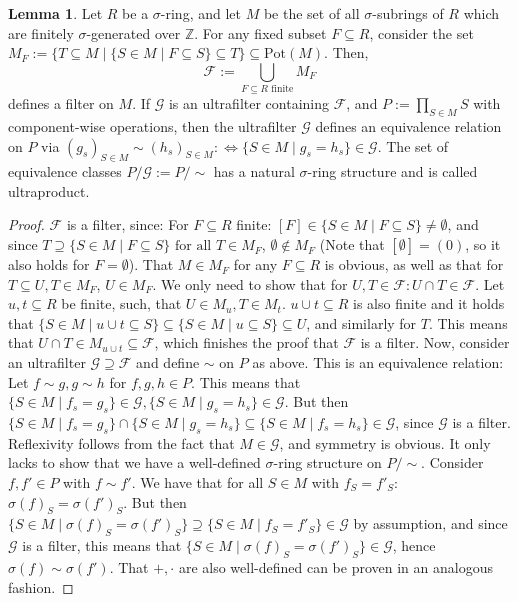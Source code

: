 \documentclass{article}
\def\Z{\mathbb{Z}}
\def\s{\sigma}
\def\fa{\text{ for all }}
\theoremstyle{definition}
\newtheorem{lem}[Satz]{Lemma}
\begin{document}
\begin{lem}\label{lemmafilters}
Let $R$ be a $\s$-ring, and let $M$ be the set of all $\s$-subrings of $R$ which are finitely $\s$-generated over $\Z$. For any fixed subset $F \subseteq R$, consider the set $M_F:= \{ T \subseteq M \mid \{S \in M \mid F \subseteq S \} \subseteq T \} \subseteq \text{Pot}(M)$. 
Then, \[ \mathcal{F}:= \bigcup_{ F \subseteq R \text{ finite} } M_F \]
 defines a filter on $M$. If $\mathcal{G}$ is an ultrafilter containing $\mathcal{F}$, and $P:= \prod_{S \in M} S$ with component-wise operations,
 then the ultrafilter $\mathcal{G}$ defines an equivalence relation on $P$ via $(g_s)_{S \in M} \sim (h_s)_{S \in M} : \Leftrightarrow \{ S \in M \mid g_s = h_s \} \in \mathcal{G}$. 
The set of equivalence classes $P/\mathcal{G}:= P/\sim$ has a natural $\s$-ring structure and is called ultraproduct. %
\begin{proof}
$\mathcal{F}$ is a filter, since: 
  For $F \subseteq R$ finite: $[F] \in \{ S \in M \mid F \subseteq S \} \neq \emptyset$, and since $T \supseteq \{ S \in M \mid F \subseteq S \} \fa T \in M_F$, $\emptyset \notin M_F$ (Note that $[\emptyset] = (0)$, so it also holds for $F = \emptyset$).
  That $M \in M_F$ for any $F \subseteq R$ is obvious, as well as that for $T \subseteq U, T \in M_F$, $U \in M_F$. We only need to show that for $U,T \in \mathcal{F}: U \cap T \in \mathcal{F}$.
  Let $u, t \subseteq R$ be finite, such, that $U \in M_u, T \in M_t$. $u \cup t \subseteq R$ is also finite and it holds that  $\{ S \in M \mid u \cup t \subseteq S \} \subseteq \{ S \in M \mid u \subseteq S \} \subseteq U$,
 and similarly for $T$. This means that $U \cap T \in M_{u \cup t} \subseteq \mathcal{F}$, which finishes the proof that $\mathcal{F}$ is a filter.
 Now, consider an ultrafilter $\mathcal{G} \supseteq \mathcal{F}$ and define $\sim$ on $P$ as above. This is an equivalence relation: Let $f \sim g, g \sim h$ for $f,g,h \in P$. 
 This means that $\{ S \in M \mid f_s = g_s \} \in \mathcal{G}, \{ S \in M \mid g_s = h_s \} \in \mathcal{G}$. But then $\{ S \in M \mid f_s = g_s \} \cap \{ S \in M \mid g_s = h_s \} \subseteq \{ S \in M \mid f_s = h_s \} \in \mathcal{G}$, since $\mathcal{G}$ is a filter.
 Reflexivity follows from the fact that $M \in \mathcal{G}$, and symmetry is obvious. It only lacks to show that we have a well-defined $\s$-ring structure on $P/\sim$.
 Consider $f,f' \in P$ with $f \sim f'$. We have that for all $S \in M$ with $f_S = f'_S$:  $\sigma(f)_S = \sigma(f')_S$. 
 But then $\{ S \in M \mid \s(f)_S = \s(f')_S \} \supseteq \{ S \in M \mid f_S = f'_S \} \in \mathcal{G}$ by assumption, and since $\mathcal{G}$ is a filter, this means that $\{ S \in M \mid \s(f)_S = \s(f')_S \} \in \mathcal{G}$,
 hence $\s(f) \sim \s(f')$. That $+, \cdot$ are also well-defined can be proven in an analogous fashion.
\end{proof}
\end{lem}
\end{document}
